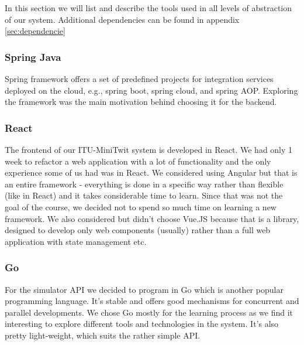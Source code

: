 In this section we will list and describe the tools used in all levels of abstraction of our system. Additional dependencies can be found in appendix \ref{sec:dependencie}
\subsubsection{Spring Java}
Spring framework offers a set of predefined projects for integration services deployed on the cloud, e.g., spring boot, spring cloud, and spring AOP. Exploring the framework was the main motivation behind choosing it for the backend.
\subsubsection{React}
The frontend of our ITU-MiniTwit system is developed in React. We had only 1 week to refactor a web application with a lot of functionality and the only experience some of us had was in React. We considered using Angular but that is an entire framework - everything is done in a specific way rather than flexible (like in React) and it takes considerable time to learn. Since that was not the goal of the course, we decided not to spend so much time on learning a new framework. We also considered but didn't choose Vue.JS because that is a library, designed to develop only web components (usually) rather than a full web application with state management etc. 

\subsubsection{Go}
For the simulator API we decided to program in Go which is another popular programming language. It's stable and offers good mechanisms for concurrent and parallel developments. We chose Go mostly for the learning process as we find it interesting to explore different tools and technologies in the system. It's also pretty light-weight, which suits the rather simple API.

